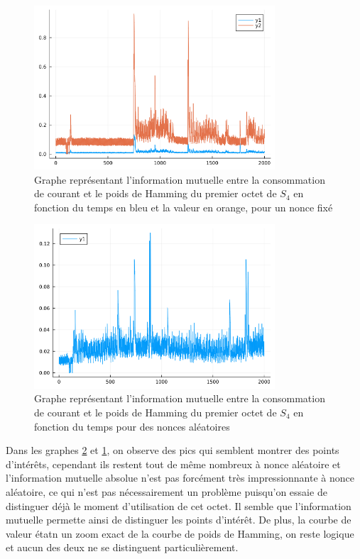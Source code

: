 \documentclass[12pt]{article}
\begin{document}
	\begin{figure}[H]
		\centering
		\includegraphics[width=0.8\textwidth]{horizontal_one_byte}
		\caption{Graphe représentant l'information mutuelle entre la consommation de courant et le poids de Hamming du premier octet de $S_4$ en fonction du temps en bleu et la valeur en orange, pour un nonce fixé}
		\label{hHW&val}
	\end{figure}
	
	\begin{figure}[H]
		\centering
		\includegraphics[width=0.8\textwidth]{hHW_one_byte}
		\caption{Graphe représentant l'information mutuelle entre la consommation de courant et le poids de Hamming du premier octet de $S_4$ en fonction du temps pour des nonces aléatoires}
		\label{hHW1}
	\end{figure}
	
	Dans les graphes \ref{hHW1} et \ref{hHW&val}, on observe des pics qui semblent montrer des points d'intérêts, cependant ils restent tout de même nombreux à nonce aléatoire et l'information mutuelle absolue n'est pas forcément très impressionnante à nonce aléatoire, ce qui n'est pas nécessairement un problème puisqu'on essaie de distinguer déjà le moment d'utilisation de cet octet. Il semble que l'information mutuelle permette ainsi de distinguer les points d'intérêt. De plus, la courbe de valeur étatn un zoom exact de la courbe de poids de Hamming, on reste logique et aucun des deux ne se distinguent particulièrement.
	
\end{document}
